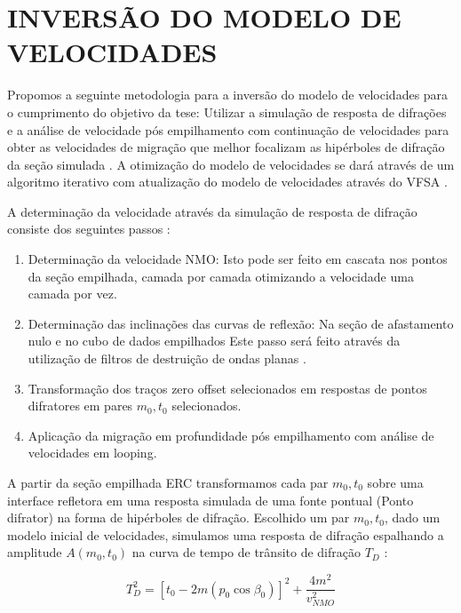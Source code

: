 \chapter{INVERSÃO DO MODELO DE VELOCIDADES}
\label{cap8:velocidades}

Propomos a seguinte metodologia para a inversão do modelo de velocidades para o cumprimento do objetivo da tese:
Utilizar a simulação de resposta de difrações \cite{diffractions} e a análise de velocidade pós empilhamento
com continuação de velocidades para obter as velocidades de migração que melhor focalizam as hipérboles
de difração da seção simulada \cite{sep_dif}. A otimização do modelo de velocidades se dará através de
um algoritmo iterativo com atualização do modelo de velocidades através do VFSA \cite{mesquita}.

A determinação da velocidade através da simulação de resposta de difração
consiste dos seguintes passos \cite{diffractions}:

\begin{enumerate}
 \item Determinação da velocidade NMO: Isto pode ser feito em cascata nos pontos da
seção empilhada, camada por camada otimizando a velocidade uma camada por vez.
\item Determinação das inclinações das curvas de reflexão: Na seção de afastamento nulo e no cubo de dados empilhados
Este passo será feito através da utilização de filtros de destruição de ondas planas \cite{planas}.
\item Transformação dos traços zero offset selecionados em respostas de pontos difratores em pares $m_0, t_0$
selecionados.
\item Aplicação da migração em profundidade pós empilhamento com análise de velocidades
em looping.
\end{enumerate}

A partir da seção empilhada ERC transformamos cada par $m_0, t_0$ sobre uma interface refletora em uma resposta simulada de
uma fonte pontual (Ponto difrator) na forma de hipérboles de difração. Escolhido um par $m_0, t_0$, dado um modelo inicial de
velocidades, simulamos uma resposta de difração espalhando a amplitude $A(m_0,t_0)$ na curva de 
tempo de trânsito de difração $T_D$ \cite{diffractions}:

\begin{equation}
 \label{eq:8.1}
 T_D^2 = [t_0 - 2 m (p_0 \cos \beta_0) ]^2 + \frac{4m^2}{v_{NMO}^2}
\end{equation}

